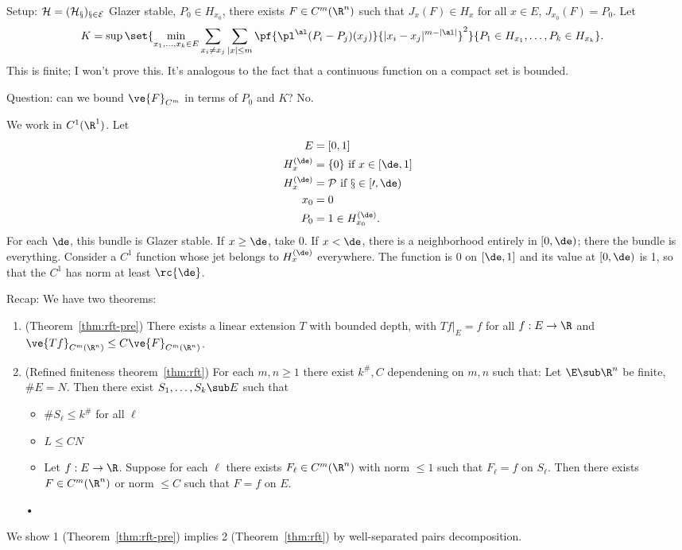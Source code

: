 
Setup: $\cal H=(H_x)_{x\in E}$ Glazer stable, $P_0\in H_{x_0}$, there exists $F\in C^m(\R^n)$ such that $J_x(F)\in H_x$ for all $x\in E$, $J_{x_0}(F)=P_0$. Let
\begin{align}
K&=\sup
\set{\min_{x_1,\ldots, x_k\in E} 
\sum_{x_i\ne x_j} \sum_{|x|\le m}
\pf{\pl^\al(P_i-P_j)(x_j)}{|x_i-x_j|^{m-|\al|}}^2}
{P_1\in H_{x_1},\ldots, P_k\in H_{x_k}}.
\end{align}
This is finite; I won't prove this. It's analogous to the fact that a continuous function on a compact set is bounded.

Question: can we bound $\ve{F}_{C^m}$ in terms of $P_0$ and $K$? No.

We work in $C^1(\R^1)$. Let 
\begin{align}
E&=[0,1]\\
H_x^{(\de)}&=\{0\}\text{ if }x\in [\de,1]\\
H_x^{(\de)}&=\cal P \text{ if }x\in [0,\de)\\
x_0&=0\\
P_0&=1\in H_{x_0}^{(\de)}.
\end{align}
For each $\de$, this bundle is Glazer stable. 
If $x\ge \de$, take 0. If $x<\de$, there is a neighborhood entirely in $[0,\de)$; there the bundle is everything.
Consider a $C^1$ function whose jet belongs to $H_x^{(\de)}$ everywhere. The function is 0 on $[\de,1]$ and its value at $[0,\de)$ is 1, so that the $C^1$ has norm at least $\rc{\de}$.



Recap: We have two theorems:
\begin{enumerate}
\item %
(Theorem~\ref{thm:rft-pre})
There exists a linear extension $T$ with bounded depth, with $Tf|_E=f$ for all $f:E\to \R$ and $\ve{Tf}_{C^m(\R^n)}\le C\ve{F}_{C^m(\R^n)}$. 
\item (Refined finiteness theorem~\ref{thm:rft})
For each $m,n\ge 1$ there exist $k^\#,C$ dependening on $m,n$ such that:
Let $\E\sub \R^n$ be finite, $\#E=N$. Then there exist $S_1,\ldots, S_k\sub E$ such that 
\begin{itemize}
\item
$\#S_\ell\le k^\#$ for all $\ell$
\item
$L\le CN$\item
Let $f:E\to \R$. Suppose for each $\ell$ there exists $F_\ell\in C^m(\R^n)$ with norm $\le 1$ such that $F_\ell=f$ on $S_\ell$. Then there exists $F\in C^m(\R^n)$ or norm $\le C$ such that $F=f$ on $E$.
\end{itemize}•
\end{enumerate}
We show 1 (Theorem~\ref{thm:rft-pre}) implies 2 (Theorem~\ref{thm:rft}) by well-separated pairs decomposition.

